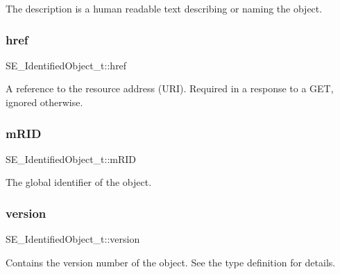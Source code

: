 The description is a human readable text describing or naming the object. \mbox{\label{group__IdentifiedObject_gaa38c752b4716c2365e11d7afd8495be1}} 
\subsubsection{\texorpdfstring{href}{href}}
{\footnotesize\ttfamily S\+E\+\_\+\+Identified\+Object\+\_\+t\+::href}

A reference to the resource address (U\+RI). Required in a response to a G\+ET, ignored otherwise. \mbox{\label{group__IdentifiedObject_ga2f6a112da8cb63840db553c07d6f5429}} 
\subsubsection{\texorpdfstring{m\+R\+ID}{mRID}}
{\footnotesize\ttfamily S\+E\+\_\+\+Identified\+Object\+\_\+t\+::m\+R\+ID}

The global identifier of the object. \mbox{\label{group__IdentifiedObject_gaffcdf964702f132d4f4078cc4864d594}} 
\subsubsection{\texorpdfstring{version}{version}}
{\footnotesize\ttfamily S\+E\+\_\+\+Identified\+Object\+\_\+t\+::version}

Contains the version number of the object. See the type definition for details. 